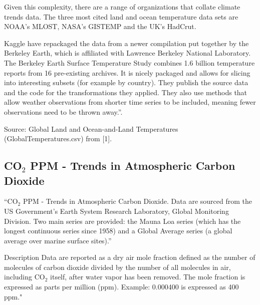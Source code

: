 \documentclass[11pt]{article}
\providecommand{\tightlist}{%
      \setlength{\itemsep}{0pt}\setlength{\parskip}{0pt}}
\begin{document}
Given this complexity, there are a range of organizations that collate
climate trends data. The three most cited land and ocean temperature
data sets are NOAA's MLOST, NASA's GISTEMP and the UK's HadCrut.


Kaggle have repackaged the data from a newer compilation put together by
the Berkeley Earth, which is affiliated with Lawrence Berkeley National
Laboratory. The Berkeley Earth Surface Temperature Study combines 1.6
billion temperature reports from 16 pre-existing archives. It is nicely
packaged and allows for slicing into interesting subsets (for example by
country). They publish the source data and the code for the
transformations they applied. They also use methods that allow weather
observations from shorter time series to be included, meaning fewer
observations need to be thrown away.''.

Source: Global Land and Ocean-and-Land Temperatures (GlobalTemperatures.csv) from [1].


\subsection{CO$_2$ PPM - Trends in Atmospheric Carbon Dioxide}

``CO$_2$ PPM - Trends in Atmospheric Carbon Dioxide. Data are sourced from
the US Government's Earth System Research Laboratory, Global Monitoring
Division. Two main series are provided: the Mauna Loa series (which has
the longest continuous series since 1958) and a Global Average series (a
global average over marine surface sites).''

Description Data are reported as a dry air mole fraction defined as the
number of molecules of carbon dioxide divided by the number of all
molecules in air, including CO$_2$ itself, after water vapor has been
removed. The mole fraction is expressed as parts per million (ppm).
Example: 0.000400 is expressed as 400 ppm."
\end{document}

